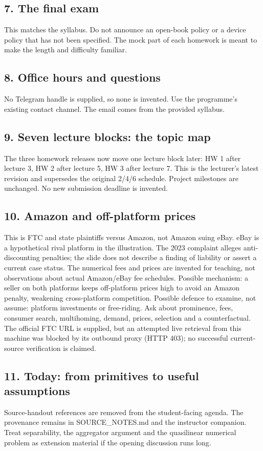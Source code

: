 \documentclass[11pt,a4paper]{article}
\begin{document}
\subsection*{7. The final exam}
This matches the syllabus. Do not announce an open-book policy or a device policy that has not been specified. The mock part of each homework is meant to make the length and difficulty familiar.

\subsection*{8. Office hours and questions}
No Telegram handle is supplied, so none is invented. Use the programme's existing contact channel. The email comes from the provided syllabus.

\subsection*{9. Seven lecture blocks: the topic map}
The three homework releases now move one lecture block later: HW 1 after lecture 3, HW 2 after lecture 5, HW 3 after lecture 7. This is the lecturer's latest revision and supersedes the original 2/4/6 schedule. Project milestones are unchanged. No new submission deadline is invented.

\subsection*{10. Amazon and off-platform prices}
This is FTC and state plaintiffs versus Amazon, not Amazon suing eBay. eBay is a hypothetical rival platform in the illustration. The 2023 complaint alleges anti-discounting penalties; the slide does not describe a finding of liability or assert a current case status. The numerical fees and prices are invented for teaching, not observations about actual Amazon/eBay fee schedules. Possible mechanism: a seller on both platforms keeps off-platform prices high to avoid an Amazon penalty, weakening cross-platform competition. Possible defence to examine, not assume: platform investments or free-riding. Ask about prominence, fees, consumer search, multihoming, demand, prices, selection and a counterfactual. The official FTC URL is supplied, but an attempted live retrieval from this machine was blocked by its outbound proxy (HTTP 403); no successful current-source verification is claimed.

\subsection*{11. Today: from primitives to useful assumptions}
Source-handout references are removed from the student-facing agenda. The provenance remains in SOURCE\_NOTES.md and the instructor companion. Treat separability, the aggregator argument and the quasilinear numerical problem as extension material if the opening discussion runs long.
\end{document}
